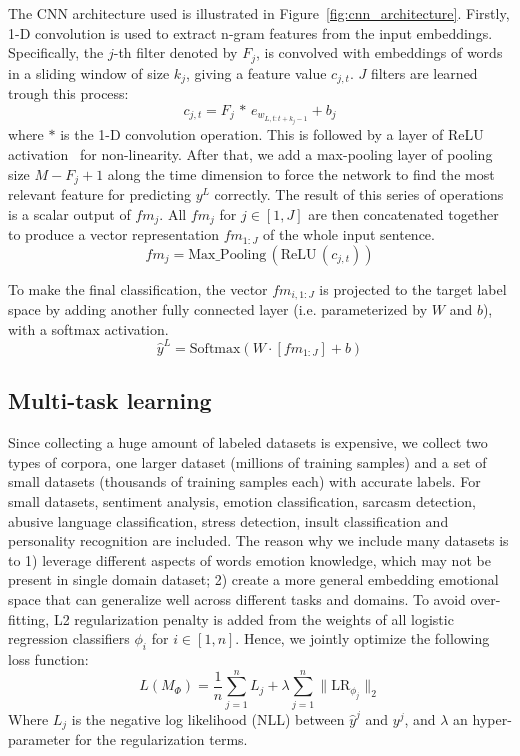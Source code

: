 \documentclass[11pt,a4paper]{article}
\begin{document}
The CNN architecture used is illustrated in Figure~\ref{fig:cnn_architecture}.  
Firstly, 1-D convolution is used to extract n-gram features from the input embeddings.  Specifically, the $j$-th filter denoted by $F_j$, is convolved with embeddings of words in a sliding window of size $k_j$, giving a feature value $c_{j,t}$. $J$ filters are learned trough this process:
\[c_{j,t} = F_j\,* \, e_{w_{L,t:t+k_j-1}} + b_j\]
where $*$ is the 1-D convolution operation. This is followed by a layer of ReLU activation~\cite{Nair2010} for non-linearity. After that, we add a max-pooling layer of pooling size $M - F_j + 1$ along the time dimension to force the network to find the most relevant feature for predicting $y^L$ correctly. The result of this series of operations is a scalar output of $fm_{j}$. All $fm_{j}$ for $j \in [1, J]$ are then concatenated together to produce a vector representation $fm_{1:J}$ of the whole input sentence.
\[  fm_{j} = \text{Max\_Pooling}\,(\text{ReLU}\,(c_{j,t}))\]

To make the final classification, the vector $fm_{i,1:J}$ is projected to the target label space by adding another fully connected layer (i.e. parameterized by $W$ and $b$), with a softmax activation. 
\[  \hat{y}^L  = 
 \text{Softmax}(W \cdot [fm_{1:J}] + b)\]
 


\subsection{Multi-task learning}

Since collecting a huge amount of labeled datasets is expensive, we collect two types of corpora, one larger dataset (millions of training samples) and a set of small datasets (thousands of training samples each) with accurate labels. For  small datasets, sentiment analysis, emotion classification, sarcasm detection, abusive language classification, stress detection, insult classification and personality recognition are included. The reason why we include many datasets is to 1) leverage different aspects of words emotion knowledge, which may not be present in single domain dataset; 2) create a more general embedding emotional space that can generalize well  across different tasks and domains. To avoid over-fitting, L2 regularization penalty is added from the weights of all logistic regression classifiers $\phi_i$ for $i \in [1, n]$. Hence, we jointly optimize the following loss function:
\[ L(M_\Phi) = \frac{1}{n}\sum_{j=1}^n  L_j +  \lambda\sum_{j=1}^n \| \text{LR}_{\phi_j} \|_2 \]
Where $L_j$ is the negative log likelihood (NLL) between $\hat{y}^j$ and $y^j$, and $\lambda$ an hyper-parameter for the regularization terms. 
\end{document}
